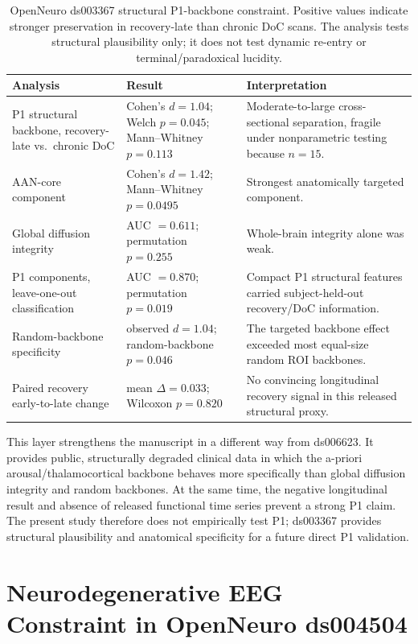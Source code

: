 \documentclass[11pt,a4paper]{article}
\theoremstyle{plain}
\theoremstyle{definition}
\theoremstyle{remark}
\begin{document}
\begin{table}[h]
\centering
\caption{OpenNeuro ds003367 structural P1-backbone constraint. Positive values indicate stronger preservation in recovery-late than chronic DoC scans. The analysis tests structural plausibility only; it does not test dynamic re-entry or terminal/paradoxical lucidity.}
\label{tab:ds003367}
\small
\begin{tabular}{p{5.1cm}p{3.0cm}p{5.0cm}}
\hline
Analysis & Result & Interpretation \\
\hline
P1 structural backbone, recovery-late vs.\ chronic DoC & Cohen's $d=1.04$; Welch $p=0.045$; Mann--Whitney $p=0.113$ & Moderate-to-large cross-sectional separation, fragile under nonparametric testing because $n=15$. \\
AAN-core component & Cohen's $d=1.42$; Mann--Whitney $p=0.0495$ & Strongest anatomically targeted component. \\
Global diffusion integrity & AUC $=0.611$; permutation $p=0.255$ & Whole-brain integrity alone was weak. \\
P1 components, leave-one-out classification & AUC $=0.870$; permutation $p=0.019$ & Compact P1 structural features carried subject-held-out recovery/DoC information. \\
Random-backbone specificity & observed $d=1.04$; random-backbone $p=0.046$ & The targeted backbone effect exceeded most equal-size random ROI backbones. \\
Paired recovery early-to-late change & mean $\Delta=0.033$; Wilcoxon $p=0.820$ & No convincing longitudinal recovery signal in this released structural proxy. \\
\hline
\end{tabular}
\end{table}

This layer strengthens the manuscript in a different way from ds006623. It provides public, structurally degraded clinical data in which the a-priori arousal/thalamocortical backbone behaves more specifically than global diffusion integrity and random backbones. At the same time, the negative longitudinal result and absence of released functional time series prevent a strong P1 claim. The present study therefore does not empirically test P1; ds003367 provides structural plausibility and anatomical specificity for a future direct P1 validation.


\section{Neurodegenerative EEG Constraint in OpenNeuro ds004504}
\label{sec:p1-proxy}
\end{document}
